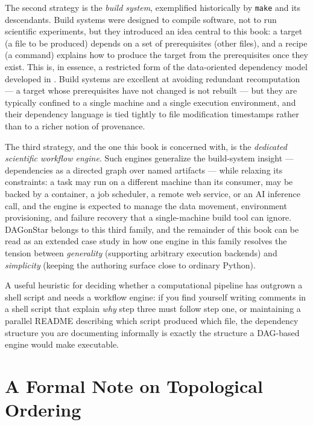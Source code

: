 The second strategy is the \emph{build system}, exemplified historically by
\texttt{make} and its descendants. Build systems were designed to compile
software, not to run scientific experiments, but they introduced an idea
central to this book: a target (a file to be produced) depends on a set of
prerequisites (other files), and a recipe (a command) explains how to
produce the target from the prerequisites once they exist. This is, in
essence, a restricted form of the data-oriented dependency model developed
in . Build systems are excellent at avoiding
redundant recomputation --- a target whose prerequisites have not changed is
not rebuilt --- but they are typically confined to a single machine and a
single execution environment, and their dependency language is tied tightly
to file modification timestamps rather than to a richer notion of
provenance.

The third strategy, and the one this book is concerned with, is the
\emph{dedicated scientific workflow engine}. Such engines generalize the
build-system insight --- dependencies as a directed graph over named
artifacts --- while relaxing its constraints: a task may run on a different
machine than its consumer, may be backed by a container, a job scheduler, a
remote web service, or an AI inference call, and the engine is expected to
manage the data movement, environment provisioning, and failure recovery
that a single-machine build tool can ignore. DAGonStar belongs to this third
family, and the remainder of this book can be read as an extended case
study in how one engine in this family resolves the tension between
\emph{generality} (supporting arbitrary execution backends) and
\emph{simplicity} (keeping the authoring surface close to ordinary Python).

\begin{practicebox}
A useful heuristic for deciding whether a computational pipeline has outgrown
a shell script and needs a workflow engine: if you find yourself writing
comments in a shell script that explain \emph{why} step three must follow
step one, or maintaining a parallel README describing which script produced
which file, the dependency structure you are documenting informally is
exactly the structure a DAG-based engine would make executable.
\end{practicebox}

\section{A Formal Note on Topological Ordering}
\label{sec:topological-ordering}

